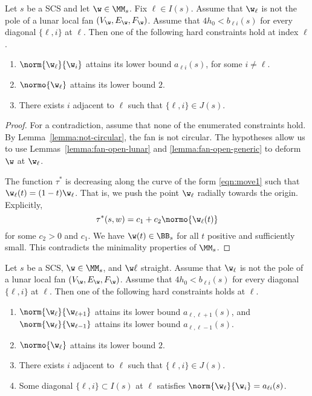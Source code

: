 \begin{lemma}\label{lemma:odx2} 
Let $s$ be a SCS and let $\w\in \MM_s$.  Fix $\ell\in I(s)$.
Assume  that $\w_\ell$ is not the pole of a lunar local fan $(V_\w,E_\w,F_\w)$.
Assume that $4h_0 < b_{\ell i}(s)$ for every diagonal $\{\ell,i\}$ at $\ell$.
Then one of the following hard  constraints hold at index $\ell$.
\begin{enumerate}
\item $\norm{\w_\ell}{\w_i}$ attains its lower bound $a_{\ell i}(s)$, for
  some $i\ne \ell$.
\item $\normo{\w_\ell}$ attains its lower bound $2$.
\item There exists $i$ adjacent to $\ell$ such that $\{\ell,i\}\in J(s)$.
\end{enumerate}
\end{lemma}

\begin{proof} 
For a contradiction, assume that none of the enumerated constraints hold.
By Lemma~\ref{lemma:not-circular}, the fan is not circular.
The hypotheses
allow us to use Lemmas~\ref{lemma:fan-open-lunar} and
\ref{lemma:fan-open-generic} to deform $\w$ at $\w_\ell$.

The function $\tau^*$ is decreasing along
the curve of the form \eqref{eqn:move1} such that
$\w_\ell(t)=(1-t) \w_\ell$.
That is, we push the point $\w_\ell$ radially towards the origin.
Explicitly, 
\[
\tau^*(s,w) = c_1 + c_2 \normo{\w_\ell(t)}
\]
for some $c_2>0$ and $c_1$.
We have
$\w(t)\in \BB_s$ for all $t$ positive and sufficiently
small.  This contradicts the minimality properties of $\MM_s$.
\end{proof}

\begin{lemma}\label{lemma:imj2}
Let $s$ be a SCS, $\w\in \MM_s$, and $\w\ell$ straight.
Assume  that $\w_\ell$ is not the pole of a lunar local fan $(V_\w,E_\w,F_\w)$.
Assume that $4h_0 < b_{\ell i}(s)$ for every diagonal $\{\ell,i\}$ at $\ell$.
Then one of the following hard constraints holds at $\ell$.
\begin{enumerate}
\item $\norm{\w_\ell}{\w_{\ell+1}}$ attains its lower bound $a_{\ell,\ell+1}(s)$, and
 $\norm{\w_\ell}{\w_{\ell-1}}$ attains its lower bound $a_{\ell,\ell-1}(s)$.
\item $\normo{\w_\ell}$ attains its lower bound $2$.
\item There exists $i$ adjacent to $\ell$ such that $\{\ell,i\}\in J(s)$.
\item Some diagonal $\{\ell,i\}\subset I(s)$ at $\ell$ satisfies
$\norm{\w_\ell}{\w_i}=a_{\ell i}(s)$.
\end{enumerate}
\end{lemma}

